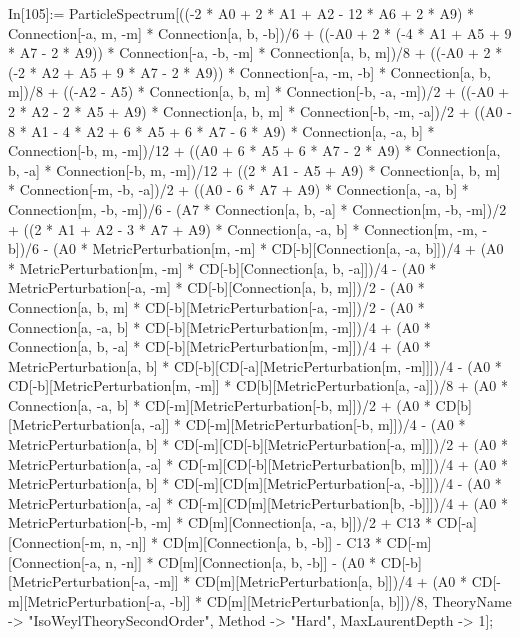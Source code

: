 In[105]:= ParticleSpectrum[((-2 * A0 + 2 * A1 + A2 - 12 * A6 + 2 * A9) * Connection[-a, m, -m] * Connection[a, b, -b])/6 + ((-A0 + 2 * (-4 * A1 + A5 + 9 * A7 - 2 * A9)) * Connection[-a, -b, -m] * Connection[a, b, m])/8 + ((-A0 + 2 * (-2 * A2 + A5 + 9 * A7 - 2 * A9)) * Connection[-a, -m, -b] * Connection[a, b, m])/8 + ((-A2 - A5) * Connection[a, b, m] * Connection[-b, -a, -m])/2 + ((-A0 + 2 * A2 - 2 * A5 + A9) * Connection[a, b, m] * Connection[-b, -m, -a])/2 + ((A0 - 8 * A1 - 4 * A2 + 6 * A5 + 6 * A7 - 6 * A9) * Connection[a, -a, b] * Connection[-b, m, -m])/12 + ((A0 + 6 * A5 + 6 * A7 - 2 * A9) * Connection[a, b, -a] * Connection[-b, m, -m])/12 + ((2 * A1 - A5 + A9) * Connection[a, b, m] * Connection[-m, -b, -a])/2 + ((A0 - 6 * A7 + A9) * Connection[a, -a, b] * Connection[m, -b, -m])/6 - (A7 * Connection[a, b, -a] * Connection[m, -b, -m])/2 + ((2 * A1 + A2 - 3 * A7 + A9) * Connection[a, -a, b] * Connection[m, -m, -b])/6 - (A0 * MetricPerturbation[m, -m] * CD[-b][Connection[a, -a, b]])/4 + (A0 * MetricPerturbation[m, -m] * CD[-b][Connection[a, b, -a]])/4 - (A0 * MetricPerturbation[-a, -m] * CD[-b][Connection[a, b, m]])/2 - (A0 * Connection[a, b, m] * CD[-b][MetricPerturbation[-a, -m]])/2 - (A0 * Connection[a, -a, b] * CD[-b][MetricPerturbation[m, -m]])/4 + (A0 * Connection[a, b, -a] * CD[-b][MetricPerturbation[m, -m]])/4 + (A0 * MetricPerturbation[a, b] * CD[-b][CD[-a][MetricPerturbation[m, -m]]])/4 - (A0 * CD[-b][MetricPerturbation[m, -m]] * CD[b][MetricPerturbation[a, -a]])/8 + (A0 * Connection[a, -a, b] * CD[-m][MetricPerturbation[-b, m]])/2 + (A0 * CD[b][MetricPerturbation[a, -a]] * CD[-m][MetricPerturbation[-b, m]])/4 - (A0 * MetricPerturbation[a, b] * CD[-m][CD[-b][MetricPerturbation[-a, m]]])/2 + (A0 * MetricPerturbation[a, -a] * CD[-m][CD[-b][MetricPerturbation[b, m]]])/4 + (A0 * MetricPerturbation[a, b] * CD[-m][CD[m][MetricPerturbation[-a, -b]]])/4 - (A0 * MetricPerturbation[a, -a] * CD[-m][CD[m][MetricPerturbation[b, -b]]])/4 + (A0 * MetricPerturbation[-b, -m] * CD[m][Connection[a, -a, b]])/2 + C13 * CD[-a][Connection[-m, n, -n]] * CD[m][Connection[a, b, -b]] - C13 * CD[-m][Connection[-a, n, -n]] * CD[m][Connection[a, b, -b]] - (A0 * CD[-b][MetricPerturbation[-a, -m]] * CD[m][MetricPerturbation[a, b]])/4 + (A0 * CD[-m][MetricPerturbation[-a, -b]] * CD[m][MetricPerturbation[a, b]])/8, TheoryName -> "IsoWeylTheorySecondOrder", Method -> "Hard", MaxLaurentDepth -> 1]; 